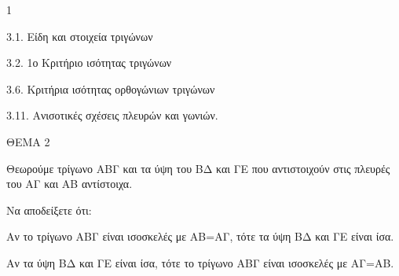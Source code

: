 \begin{ylh}{1}
    \item 3.1. Είδη και στοιχεία τριγώνων
    \item 3.2. 1ο Κριτήριο ισότητας τριγώνων
    \item 3.6. Κριτήρια ισότητας ορθογώνιων τριγώνων
    \item 3.11. Ανισοτικές σχέσεις πλευρών και γωνιών.
\end{ylh}

ΘΕΜΑ 2

Θεωρούμε τρίγωνο ΑΒΓ και τα ύψη του ΒΔ και ΓΕ που αντιστοιχούν στις πλευρές του ΑΓ και ΑΒ αντίστοιχα.

Να αποδείξετε ότι:

\begin{alist}
\item Αν το τρίγωνο ΑΒΓ είναι ισοσκελές με ΑΒ=ΑΓ, τότε τα ύψη ΒΔ και ΓΕ είναι ίσα.


\item Αν τα ύψη ΒΔ και ΓΕ είναι ίσα, τότε το τρίγωνο ΑΒΓ είναι ισοσκελές με ΑΓ=ΑΒ.

\end{alist}
